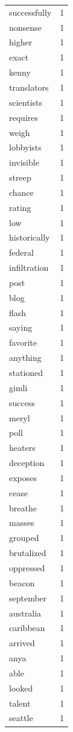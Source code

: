 \begin{tabular}{lr}
successfully & 1 \\
nonsense & 1 \\
higher & 1 \\
exact & 1 \\
kenny & 1 \\
translators & 1 \\
scientists & 1 \\
requires & 1 \\
weigh & 1 \\
lobbyists & 1 \\
invisible & 1 \\
streep & 1 \\
chance & 1 \\
rating & 1 \\
low & 1 \\
historically & 1 \\
federal & 1 \\
infiltration & 1 \\
post & 1 \\
blog & 1 \\
flash & 1 \\
saying & 1 \\
favorite & 1 \\
anything & 1 \\
stationed & 1 \\
gimli & 1 \\
success & 1 \\
meryl & 1 \\
poll & 1 \\
heaters & 1 \\
deception & 1 \\
exposes & 1 \\
cease & 1 \\
breathe & 1 \\
masses & 1 \\
grouped & 1 \\
brutalized & 1 \\
oppressed & 1 \\
beacon & 1 \\
september & 1 \\
australia & 1 \\
caribbean & 1 \\
arrived & 1 \\
anya & 1 \\
able & 1 \\
looked & 1 \\
talent & 1 \\
seattle & 1 \\

\end{tabular}
